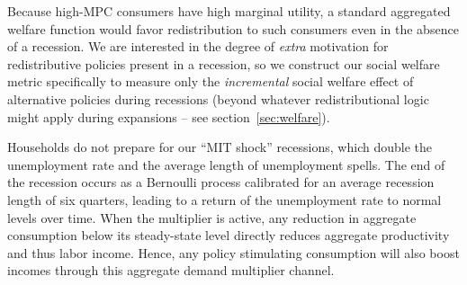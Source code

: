 \documentclass[\econtexRoot/HAFiscal]{subfiles}
\begin{document}
Because high-MPC consumers have high marginal utility, a standard aggregated welfare function would favor redistribution to such consumers even in the absence of a recession. We are interested in the degree of \textit{extra} motivation for redistributive policies present in a recession, so we construct our social welfare metric specifically to measure only the \textit{incremental} social welfare effect of alternative policies during recessions (beyond whatever redistributional logic might apply during expansions -- see section~\ref{sec:welfare}).

Households do not prepare for our ``MIT shock'' recessions, which double the unemployment rate and the average length of unemployment spells. The end of the recession occurs as a Bernoulli process calibrated for an average recession length of six quarters, leading to a return of the unemployment rate to normal levels over time. When the multiplier is active, any reduction in aggregate consumption below its steady-state level directly reduces aggregate productivity and thus labor income. Hence, any policy stimulating consumption will also boost incomes through this aggregate demand multiplier channel.

\end{document}
